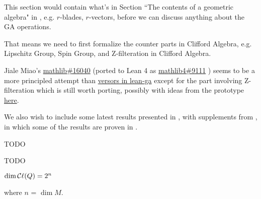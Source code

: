 This section would contain what's in Section ``The contents of a geometric algebra" in \cite{chisolm2012geometric}, e.g. $r$-blades, $r$-vectors, before we can discuss anything about the GA operations.

That means we need to first formalize the counter parts in Clifford Algebra, e.g. Lipschitz Group, Spin Group, and Z-filteration in Clifford Algebra.

Jiale Miao's \href{https://github.com/leanprover-community/mathlib/pull/16040}{mathlib\#16040} (ported to Lean 4 as \href{https://github.com/leanprover-community/mathlib4/pull/9111}{mathlib4\#9111} ) seems to be a more principled attempt than \href{https://github.com/pygae/lean-ga/blob/master/src/geometric_algebra/from_mathlib/versors.lean}{versors in lean-ga} except for the part involving Z-filteration which is still worth porting, possibly with ideas from the prototype \href{https://github.com/eric-wieser/lftcm2023-clifford_algebra/}{here}.

We also wish to include some latest results presented in \cite{ruhe2023clifford}, with supplements from \cite{brehmer2023geometric},
in which some of the results are proven in \cite{roelfs2023graded}.

\begin{definition}
    \label{Lipschitz}
    \tangled

    TODO

\end{definition}

\begin{definition}
    \label{SpinGroup}
    \tangled

    TODO

\end{definition}

\begin{theorem}
    \label{dim}
    \tangled

    $\dim \mathop{\mathcal{C}\ell}(Q) = 2^n$

    where $n$ = $\dim M$.

\end{theorem}